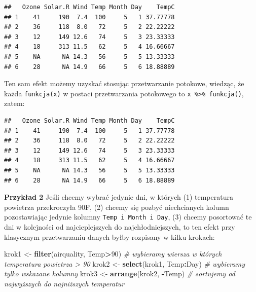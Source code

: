 \documentclass[]{book}
\newenvironment{Shaded}{\begin{snugshade}}{\end{snugshade}}
\newcommand{\KeywordTok}[1]{\textcolor[rgb]{0.13,0.29,0.53}{\textbf{#1}}}
\newcommand{\DecValTok}[1]{\textcolor[rgb]{0.00,0.00,0.81}{#1}}
\newcommand{\StringTok}[1]{\textcolor[rgb]{0.31,0.60,0.02}{#1}}
\newcommand{\CommentTok}[1]{\textcolor[rgb]{0.56,0.35,0.01}{\textit{#1}}}
\newcommand{\OperatorTok}[1]{\textcolor[rgb]{0.81,0.36,0.00}{\textbf{#1}}}
\newcommand{\NormalTok}[1]{#1}
\theoremstyle{definition}
\theoremstyle{definition}
\theoremstyle{definition}
\theoremstyle{remark}
\begin{document}
\begin{verbatim}
##   Ozone Solar.R Wind Temp Month Day    TempC
## 1    41     190  7.4  100     5   1 37.77778
## 2    36     118  8.0   72     5   2 22.22222
## 3    12     149 12.6   74     5   3 23.33333
## 4    18     313 11.5   62     5   4 16.66667
## 5    NA      NA 14.3   56     5   5 13.33333
## 6    28      NA 14.9   66     5   6 18.88889
\end{verbatim}

Ten sam efekt możemy uzyskać stosując przetwarzanie potokowe, wiedząc,
że każda \texttt{funkcja(x)} w postaci przetwarzania potokowego to
\texttt{x\ \%\textgreater{}\%\ funkcja()}, zatem:

\begin{Shaded}
\end{Shaded}

\begin{verbatim}
##   Ozone Solar.R Wind Temp Month Day    TempC
## 1    41     190  7.4  100     5   1 37.77778
## 2    36     118  8.0   72     5   2 22.22222
## 3    12     149 12.6   74     5   3 23.33333
## 4    18     313 11.5   62     5   4 16.66667
## 5    NA      NA 14.3   56     5   5 13.33333
## 6    28      NA 14.9   66     5   6 18.88889
\end{verbatim}

\textbf{Przykład 2} Jeśli chcemy wybrać jedynie dni, w których (1)
temperatura powietrza przekroczyła 90F, (2) chcemy się pozbyć
niechcianych kolumn pozostawiając jedynie kolumny
\texttt{Temp\ i\ Month\ i\ Day}, (3) chcemy posortować te dni w
kolejności od najcieplejszych do najchłodniejszych, to ten efekt przy
klasycznym przetwarzaniu danych byłby rozpisany w kilku krokach:

\begin{Shaded}
\begin{Highlighting}[]
\NormalTok{krok1 <-}\StringTok{ }\KeywordTok{filter}\NormalTok{(airquality, Temp}\OperatorTok{>}\DecValTok{90}\NormalTok{) }\CommentTok{# wybieramy wiersza w których temperatura powietrza > 90}
\NormalTok{krok2 <-}\StringTok{ }\KeywordTok{select}\NormalTok{(krok1, Temp}\OperatorTok{:}\NormalTok{Day) }\CommentTok{# wybieramy tylko wskazane kolumny}
\NormalTok{krok3 <-}\StringTok{ }\KeywordTok{arrange}\NormalTok{(krok2, }\OperatorTok{-}\NormalTok{Temp) }\CommentTok{# sortujemy od najwyższych do najniższych temperatur}
\end{Highlighting}
\end{Shaded}
\end{document}
